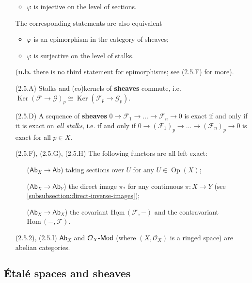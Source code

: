 \documentclass[10pt]{article}
\DeclareMathOperator{\Op}{Op}
\DeclareMathOperator{\Ker}{Ker}
\newcommand{\Ab}{\mathsf{Ab}}
\newcommand{\Mod}[1]{{#1}\hbox{-}\mathsf{Mod}}
\newcommand{\fsheaf}{\mathcal{F}}
\newcommand{\gsheaf}{\mathcal{G}}
\renewcommand{\O}{\mathcal{O}}
\newcommand{\sHom}{\underline{\mathrm{Hom}}\,}
\begin{document}
\begin{itemize}
\begin{itemize}
                            \item $\varphi$ is injective on the level of sections.
                        \end{itemize}
                        The corresponding statements are also equivalent
                        \begin{itemize}
                            \item $\varphi$ is an epimorphism in the category of sheaves;
                            \item $\varphi$ is surjective on the level of stalks.
                        \end{itemize}
                        (\textbf{n.b.} there is no third statement for epimorphisms; see (2.5.F) for more).
                    \item[(2.5.A)] Stalks and (co)kernels of \textbf{sheaves} commute, i.e. $\Ker(\fsheaf\to\gsheaf)_p\cong\Ker(\fsheaf_p\to\gsheaf_p)$.
                    \item[(2.5.D)] A sequence of \textbf{sheaves} $0\to\fsheaf_1\to\ldots\to\fsheaf_n\to0$ is exact if and only if it is exact on \textit{all stalks}, i.e. if and only if $0\to(\fsheaf_1)_p\to\ldots\to(\fsheaf_n)_p\to0$ is exact for all $p\in X$.
                    \item[(2.5.F), (2.5.G), (2.5.H)] The following functors are all left exact:
                        \begin{itemize}
                            \item[($\Ab_X\to\Ab$)] taking sections over $U$ for any $U\in\Op(X)$;
                            \item[($\Ab_X\to\Ab_Y$)] the direct image $\pi_*$ for any continuous $\pi\colon X\to Y$ (see \cref{subsubsection:direct-inverse-images});
                            \item[($\Ab_X\to\Ab_X$)] the covariant $\sHom(\fsheaf,-)$ and the contravariant $\sHom(-,\fsheaf)$.
                        \end{itemize}
                    \item[(2.5.2), (2.5.I)] $\Ab_X$ and $\Mod{\O_X}$ (where $(X,\O_X)$ is a ringed space) are abelian categories.
                \end{itemize}
            
        \subsection{Étalé spaces and sheaves}\label{subsection:espace-etale}
        
\end{document}

